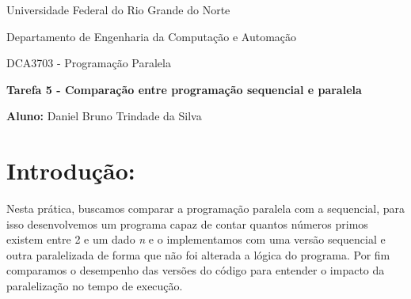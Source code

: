 \documentclass[a4paper, 12pt]{article}
\begin{document}
	\begin{center}
		Universidade Federal do Rio Grande do Norte
		
		Departamento de Engenharia da Computação e Automação
		
		DCA3703 - Programação Paralela
		
		\textbf{Tarefa 5 - Comparação entre programação sequencial e paralela}
		
		\textbf{Aluno:} Daniel Bruno Trindade da Silva
	\end{center}
	
	\section{Introdução:}
	\hspace{.7cm}Nesta prática, buscamos comparar a programação paralela com a sequencial, para isso desenvolvemos um programa capaz de contar quantos números primos existem entre 2 e um dado \textit{n} e o implementamos com uma versão sequencial e outra paralelizada de forma que não foi alterada a lógica do programa. Por fim comparamos o desempenho das versões do código para entender o impacto da paralelização no tempo de execução. 
\end{document}
